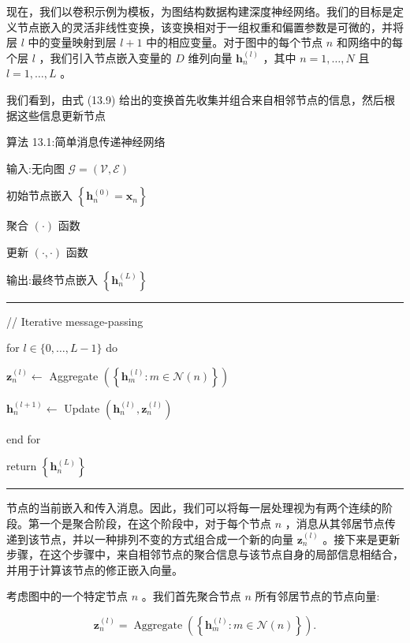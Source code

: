 \documentclass[10pt]{report}
\newcommand{\HRule}{\begin{center}\rule{0.9\linewidth}{0.2mm}\end{center}}
\begin{document}
现在，我们以卷积示例为模板，为图结构数据构建深度神经网络。我们的目标是定义节点嵌入的灵活非线性变换，该变换相对于一组权重和偏置参数是可微的，并将层 \(l\) 中的变量映射到层 \(l + 1\) 中的相应变量。对于图中的每个节点 \(n\) 和网络中的每个层 \(l\) ，我们引入节点嵌入变量的 \(D\) 维列向量 \({\mathbf{h}}_{n}^{\left( l\right) }\) ，其中 \(n = 1,\ldots ,N\) 且 \(l = 1,\ldots ,L\) 。

我们看到，由式 (13.9) 给出的变换首先收集并组合来自相邻节点的信息，然后根据这些信息更新节点

算法 13.1:简单消息传递神经网络

输入:无向图 \(\mathcal{G} = \left( {\mathcal{V},\mathcal{E}}\right)\)

初始节点嵌入 \(\left\{  {{\mathbf{h}}_{n}^{\left( 0\right) } = {\mathbf{x}}_{n}}\right\}\)

聚合 \(\left( \cdot \right)\) 函数

更新 \(\left( {\cdot , \cdot  }\right)\) 函数

输出:最终节点嵌入 \(\left\{  {\mathbf{h}}_{n}^{\left( L\right) }\right\}\)

\HRule

// Iterative message-passing

for \(l \in  \{ 0,\ldots ,L - 1\}\) do

\hspace*{1em} \({\mathbf{z}}_{n}^{\left( l\right) } \leftarrow\) Aggregate \(\left( \left\{  {{\mathbf{h}}_{m}^{\left( l\right) } : m \in  \mathcal{N}\left( n\right) }\right\}  \right)\)

\hspace*{1em} \({\mathbf{h}}_{n}^{\left( l + 1\right) } \leftarrow\) Update \(\left( {{\mathbf{h}}_{n}^{\left( l\right) },{\mathbf{z}}_{n}^{\left( l\right) }}\right)\)

end for

return \(\left\{  {\mathbf{h}}_{n}^{\left( L\right) }\right\}\)

\HRule

节点的当前嵌入和传入消息。因此，我们可以将每一层处理视为有两个连续的阶段。第一个是聚合阶段，在这个阶段中，对于每个节点 \(n\) ，消息从其邻居节点传递到该节点，并以一种排列不变的方式组合成一个新的向量 \({\mathbf{z}}_{n}^{\left( l\right) }\) 。接下来是更新步骤，在这个步骤中，来自相邻节点的聚合信息与该节点自身的局部信息相结合，并用于计算该节点的修正嵌入向量。

考虑图中的一个特定节点 \(n\) 。我们首先聚合节点 \(n\) 所有邻居节点的节点向量:

\[
{\mathbf{z}}_{n}^{\left( l\right) } = \operatorname{Aggregate}\left( \left\{  {{\mathbf{h}}_{m}^{\left( l\right) } : m \in  \mathcal{N}\left( n\right) }\right\}  \right) . \tag{13.10}
\]
\end{document}
